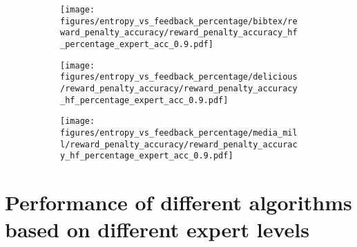 \begin{figure}[t]
    \begin{subfigure}[b]{0.32\columnwidth}
        \centering
        \texttt{[image: figures/entropy\_vs\_feedback\_percentage/bibtex/reward\_penalty\_accuracy/reward\_penalty\_accuracy\_hf\_percentage\_expert\_acc\_0.9.pdf]}
    \end{subfigure}
    \hfill
    \begin{subfigure}[b]{0.32\columnwidth}
        \centering
        \texttt{[image: figures/entropy\_vs\_feedback\_percentage/delicious/reward\_penalty\_accuracy/reward\_penalty\_accuracy\_hf\_percentage\_expert\_acc\_0.9.pdf]}
    \end{subfigure}
    \hfill
    \begin{subfigure}[b]{0.32\columnwidth}
        \centering
        \texttt{[image: figures/entropy\_vs\_feedback\_percentage/media\_mill/reward\_penalty\_accuracy/reward\_penalty\_accuracy\_hf\_percentage\_expert\_acc\_0.9.pdf]}
    \end{subfigure}
    \hfill
   
   
\end{figure}
\section{Performance of different algorithms based on different expert levels}

